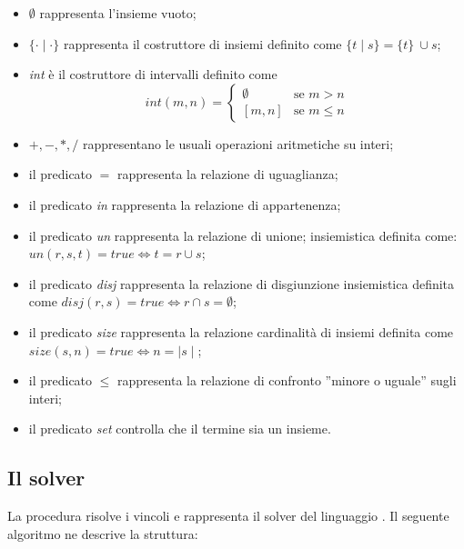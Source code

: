 \documentclass[12pt,a4paper,openright]{book} %
\begin{document}
\begin{itemize}
\item $\emptyset$ rappresenta l’insieme vuoto;
\item $\{\cdot\mid\cdot\}$ rappresenta il costruttore di insiemi definito come $\{t\mid s\} = \{t\}\ \cup s$;
\item \textit{int} è il costruttore di intervalli definito come
\begin{equation}
int (m, n ) =
  \begin{cases}
    \emptyset & \text{se } m > n \\
    [ m, n ] & \text{se } m \leq n
  \end{cases}
\end{equation}
\item $+, -, \ast, /$ rappresentano le usuali operazioni aritmetiche su interi;
\item il predicato $=$ rappresenta la relazione di uguaglianza;
\item il predicato \textit{in} rappresenta la relazione di appartenenza;
\item il predicato \textit{un} rappresenta la relazione di unione; insiemistica definita come:
$un(r,s,t) = true \Longleftrightarrow t = r \cup s$;
\item il predicato \textit{disj} rappresenta la relazione di disgiunzione insiemistica definita come
$disj(r,s) = true \Longleftrightarrow r \cap s = \emptyset$;
\item il predicato \textit{size} rappresenta la relazione cardinalità di insiemi definita come $size(s, n) = true \Longleftrightarrow n = \mid s \mid$;
\item il predicato $\leq$ rappresenta la relazione di confronto ”minore o uguale” sugli interi;
\item il predicato \textit{set} controlla che il termine sia un insieme.
\end{itemize}

\subsection{Il solver \satset{}}
\label{subsec:lang_lset_solver}

La procedura \satset{} risolve i vincoli e rappresenta il solver del linguaggio \clpset{}. Il seguente algoritmo ne descrive la struttura:
\end{document}
